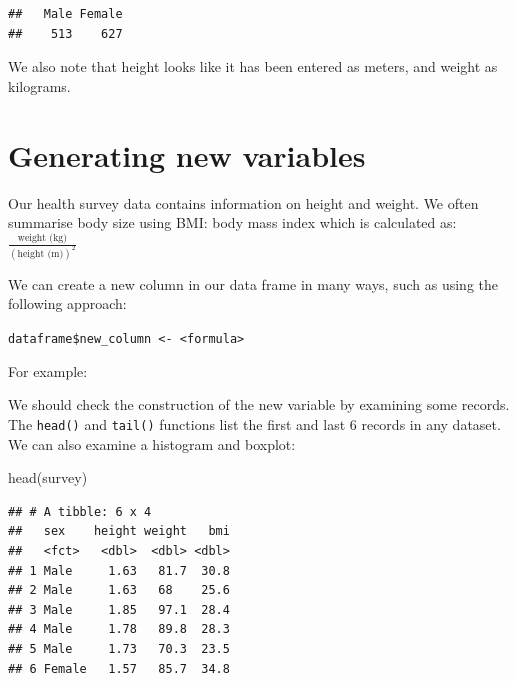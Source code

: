 \documentclass[
]{memoir}
\newenvironment{Shaded}{\begin{snugshade}}{\end{snugshade}}
\newcommand{\DecValTok}[1]{\textcolor[rgb]{0.00,0.00,0.81}{#1}}
\newcommand{\FunctionTok}[1]{\textcolor[rgb]{0.00,0.00,0.00}{#1}}
\newcommand{\NormalTok}[1]{#1}
\newcommand{\OtherTok}[1]{\textcolor[rgb]{0.56,0.35,0.01}{#1}}
\newcommand{\SpecialCharTok}[1]{\textcolor[rgb]{0.00,0.00,0.00}{#1}}
\begin{document}
\begin{verbatim}
##   Male Female 
##    513    627
\end{verbatim}

We also note that height looks like it has been entered as meters, and weight as kilograms.

\hypertarget{generating-new-variables}{%
\section{Generating new variables}\label{generating-new-variables}}

Our health survey data contains information on height and weight. We often summarise body size using BMI: body mass index which is calculated as: \(\frac{\text{weight (kg)}}{(\text{height (m)})^2}\)

We can create a new column in our data frame in many ways, such as using the following approach:

\texttt{dataframe\$new\_column\ \textless{}-\ \textless{}formula\textgreater{}}

For example:

\begin{Shaded}
\end{Shaded}

We should check the construction of the new variable by examining some records. The \texttt{head()} and \texttt{tail()} functions list the first and last 6 records in any dataset. We can also examine a histogram and boxplot:

\begin{Shaded}
\begin{Highlighting}[]
\FunctionTok{head}\NormalTok{(survey)}
\end{Highlighting}
\end{Shaded}

\begin{verbatim}
## # A tibble: 6 x 4
##   sex    height weight   bmi
##   <fct>   <dbl>  <dbl> <dbl>
## 1 Male     1.63   81.7  30.8
## 2 Male     1.63   68    25.6
## 3 Male     1.85   97.1  28.4
## 4 Male     1.78   89.8  28.3
## 5 Male     1.73   70.3  23.5
## 6 Female   1.57   85.7  34.8
\end{verbatim}
\end{document}
